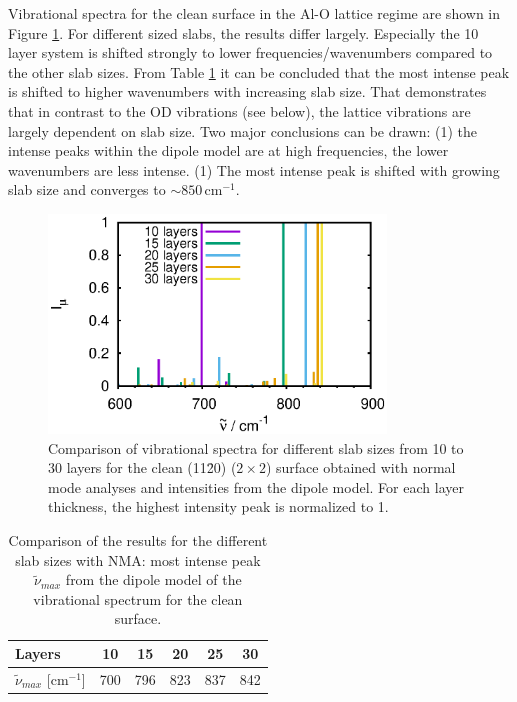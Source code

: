 \documentclass[11pt,DIV=13,BCOR=5mm,a4paper,headinclude]{scrbook}
\begin{document}
Vibrational spectra for the clean surface in the Al-O lattice regime are shown in Figure \ref{abb:clean_comp_layer}.
For different sized slabs, the results differ largely.
Especially the 10 layer system is shifted strongly to lower frequencies/wavenumbers compared to the other slab sizes.
From Table \ref{tab:comp_norm-modes_clean} it can be concluded that the most intense peak is shifted to higher wavenumbers with increasing slab size.
That demonstrates that in contrast to the OD vibrations (see below), the lattice vibrations are largely dependent on slab size.
Two major conclusions can be drawn: (1) the intense peaks within the dipole model are at high frequencies, the lower wavenumbers are less intense. (1) The most intense peak is shifted with growing slab size and converges to $\sim 850\,$cm$^{-1}$.


\begin{figure}[!h]
 \centering
 \includegraphics[width=0.8\textwidth]{figures/11-20/comp_freq_surf.eps}
 \caption{Comparison of vibrational spectra for different slab sizes from 10 to 30 layers for the clean (11\=20) ($2\times 2$) surface obtained with normal mode analyses and intensities from the dipole model.
 For each layer thickness, the highest intensity peak is normalized to 1.}
 \label{abb:clean_comp_layer}
\end{figure}
\begin{table}[!h]
  \centering
 \caption{Comparison of the results for the different slab sizes with NMA: most intense peak $\tilde{\nu}_{max}$ from the dipole model of the vibrational spectrum for the clean surface.}
\vspace*{.2cm} 
  \begin{tabular}{l|ccccc}
  \toprule
Layers& 10&15&20&25&30 \\\midrule
$\tilde{\nu}_{max}$ [cm$^{-1}$] &700 &796& 823&837 & 842\\\bottomrule
  \end{tabular}
  \label{tab:comp_norm-modes_clean}
\end{table}
\end{document}
